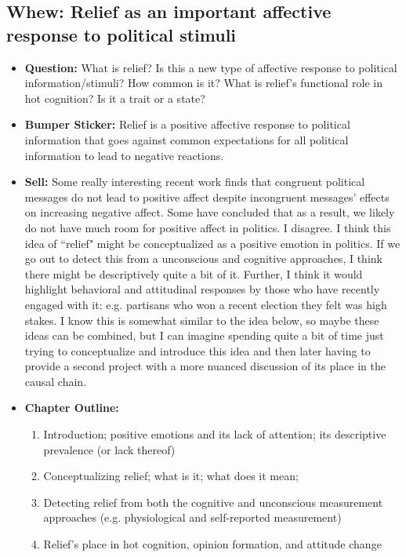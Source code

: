 \documentclass[12pt]{article}
\begin{document}
\subsection{Whew: Relief as an important affective response to political stimuli}
    \begin{itemize}
        \item \textbf{Question:} What is relief? Is this a new type of affective response to political information/stimuli? How common is it? What is relief's functional role in hot cognition? Is it a trait or a state?
        \item \textbf{Bumper Sticker:} Relief is a positive affective response to political information that goes against common expectations for all political information to lead to negative reactions.
        \item \textbf{Sell:} Some really interesting recent work finds that congruent political messages do not lead to positive affect despite incongruent messages' effects on increasing negative affect. Some have concluded that as a result, we likely do not have much room for positive affect in politics. I disagree. I think this idea of ``relief" might be conceptualized as a positive emotion in politics. If we go out to detect this from a unconscious and cognitive approaches, I think there might be descriptively quite a bit of it. Further, I think it would highlight behavioral and attitudinal responses by those who have recently engaged with it: e.g. partisans who won a recent election they felt was high stakes. I know this is somewhat similar to the idea below, so maybe these ideas can be combined, but I can imagine spending quite a bit of time just trying to conceptualize and introduce this idea and then later having to provide a second project with a more nuanced discussion of its place in the causal chain.
        \item \textbf{Chapter Outline:}
        \begin{enumerate}
            \item Introduction; positive emotions and its lack of attention; its descriptive prevalence (or lack thereof)
            \item Conceptualizing relief; what is it; what does it mean;
            \item Detecting relief from both the cognitive and unconscious measurement approaches (e.g. physiological and self-reported measurement)
            \item Relief's place in hot cognition, opinion formation, and attitude change

\end{enumerate}
\end{itemize}
\end{document}
